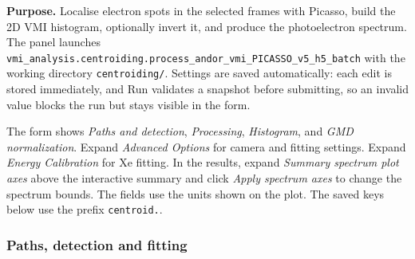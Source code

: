 \documentclass[11pt,a4paper]{article}
\newcommand{\code}[1]{\texttt{#1}}
\begin{document}
\textbf{Purpose.} Localise electron spots in the selected frames with Picasso, build
the 2D VMI histogram, optionally invert it, and produce the photoelectron
spectrum. The panel launches
\code{vmi\_\allowbreak{}analysis.centroiding.process\_\allowbreak{}andor\_\allowbreak{}vmi\_\allowbreak{}PICASSO\_\allowbreak{}v5\_\allowbreak{}h5\_\allowbreak{}batch}
with the working directory \code{centroiding/\allowbreak{}}. Settings are saved
automatically: each edit is stored immediately, and Run validates a snapshot
before submitting, so an invalid value blocks the run but stays visible in
the form.

The form shows \emph{Paths and detection}, \emph{Processing},
\emph{Histogram}, and \emph{GMD normalization}. Expand \emph{Advanced Options}
for camera and fitting settings. Expand \emph{Energy Calibration} for Xe
fitting. In the results, expand \emph{Summary spectrum plot axes} above the
interactive summary and click \emph{Apply spectrum axes} to change the
spectrum bounds. The fields use the units shown on the plot.
The saved keys below use the prefix \code{centroid.}.

\subsubsection*{Paths, detection and fitting}
\end{document}
